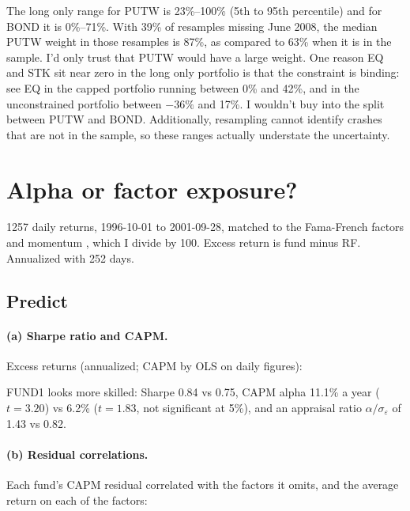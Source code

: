 \documentclass[11pt]{article}
\newcommand{\tbl}[1]{}
\begin{document}
The long only range for PUTW is 23\%--100\% (5th to 95th percentile) and for BOND it is 0\%--71\%. With 39\% of resamples missing June 2008, the median PUTW weight in those resamples is 87\%, as compared to 63\% when it is in the sample. I'd only trust that PUTW would have a large weight. One reason EQ and STK sit near zero in the long only portfolio is that the constraint is binding: see EQ in the capped portfolio running between 0\% and 42\%, and in the unconstrained portfolio between $-36\%$ and 17\%. I wouldn't buy into the split between PUTW and BOND. Additionally, resampling cannot identify crashes that are not in the sample, so these ranges actually understate the uncertainty.

\section{Alpha or factor exposure?}

1257 daily returns, 1996-10-01 to 2001-09-28, matched to the Fama-French factors and momentum \citep{fama1993common,carhart1997persistence,french2024data}, which I divide by 100. Excess return is fund minus RF. Annualized with 252 days.

\subsection*{Predict}

\paragraph{(a) Sharpe ratio and CAPM.} Excess returns (annualized; CAPM by OLS on daily figures):

\begin{table}[H]
\centering\small
\caption{Annualized excess return, vol and Sharpe ratio, and the CAPM fit.}
\tbl{p5_summary}
\end{table}

FUND1 looks more skilled: Sharpe 0.84 vs 0.75, CAPM alpha 11.1\% a year ($t=3.20$) vs 6.2\% ($t=1.83$, not significant at 5\%), and an appraisal ratio $\alpha/\sigma_\varepsilon$ of 1.43 vs 0.82.

\paragraph{(b) Residual correlations.} Each fund's CAPM residual correlated with the factors it omits, and the average return on each of the factors:
\end{document}
